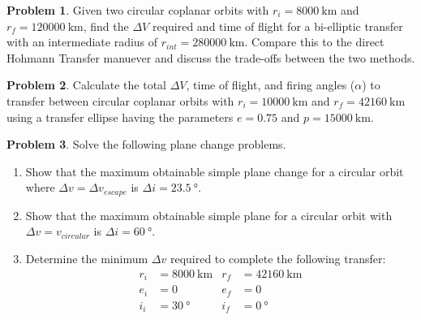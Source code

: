\documentclass[10pt]{article}
\theoremstyle{definition}
\newtheorem{prob}{Problem}[section]
\newenvironment{subprob}%
{\renewcommand{\theenumi}{\alph{enumi}}\renewcommand{\labelenumi}{(\theenumi)}\begin{enumerate}}%
{\end{enumerate}}%
\begin{document}
\begin{prob}
    Given two circular coplanar orbits with \( r_i = \SI{8000}{\kilo\meter}\) and \( r_f = \SI{120000}{\kilo\meter}\), find the \( \Delta V \) required and time of flight for a bi-elliptic transfer with an intermediate radius of \( r_{int} = \SI{280000}{\kilo\meter}\). 
    Compare this to the direct Hohmann Transfer manuever and discuss the trade-offs between the two methods.
\end{prob}

\begin{prob} 
    Calculate the total \( \Delta V \), time of flight, and firing angles (\(\alpha\)) to transfer between circular coplanar orbits with \( r_i = \SI{10000}{\kilo\meter}\) and \( r_f = \SI{42160}{\kilo\meter}\) using a transfer ellipse having the parameters \( e = 0.75\) and \( p = \SI{15000}{\kilo\meter}\).
\end{prob}

\begin{prob}
    Solve the following plane change problems.
    \begin{subprob}
    \item Show that the maximum obtainable simple plane change for a circular orbit where \( \Delta v = \Delta v_{escape} \) is \( \Delta i = \SI{23.5}{\degree}\).
    \item Show that the maximum obtainable simple plane for a circular orbit with \( \Delta v = v_{circular}\) is \( \Delta i = \SI{60}{\degree}\).
    \item Determine the minimum  \( \Delta v \) required to complete the following transfer:
        \begin{align*}
            r_i &= \SI{8000}{\kilo\meter} &r_f &= \SI{42160}{\kilo\meter} \\
            e_i &= 0  &e_f &= 0 \\
            i_i &= \SI{30}{\degree} &i_f&=\SI{0}{\degree}
        \end{align*}
    \end{subprob}
\end{prob}
\end{document}
